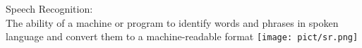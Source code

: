 \documentclass{beamer}
\begin{document}

\begin{frame}[t, fragile]
\LARGE{Speech Recognition}:\\
\small{The ability of a machine or program to identify words and phrases in spoken language and convert them to a machine-readable format}
\texttt{[image: pict/sr.png]}
\end{frame}
\end{document}
